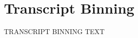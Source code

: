 \graphicspath{{chapters/5.Chapter_3/figures}}

\chapter{Transcript Binning}

TRANSCRIPT BINNING TEXT
